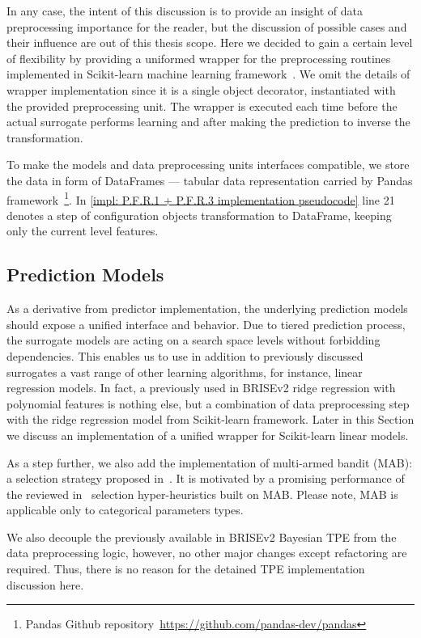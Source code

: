 In any case, the intent of this discussion is to provide an insight of data preprocessing importance for the reader, but the discussion of possible cases and their influence are out of this thesis scope. Here we decided to gain a certain level of flexibility by providing a uniformed wrapper for the preprocessing routines implemented in Scikit-learn machine learning framework~\cite{scikit-learn}. We omit the details of wrapper implementation since it is a single object decorator, instantiated with the provided preprocessing unit. The wrapper is executed each time before the actual surrogate performs learning and after making the prediction to inverse the transformation.

To make the models and data preprocessing units interfaces compatible, we store the data in form of DataFrames --- tabular data representation carried by Pandas framework~\footnote{Pandas Github repository~\url{https://github.com/pandas-dev/pandas}}. In \cref{impl: P.F.R.1 + P.F.R.3 implementation pseudocode} line 21 denotes a step of configuration objects transformation to DataFrame, keeping only the current level features.


\subsection{Prediction Models}\label{impl: prediction models}
As a derivative from predictor implementation, the underlying prediction models should expose a unified interface and behavior. Due to tiered prediction process, the surrogate models are acting on a search space levels without forbidding dependencies. This enables us to use in addition to previously discussed surrogates a vast range of other learning algorithms, for instance, linear regression models. In fact, a previously used in BRISEv2 ridge regression with polynomial features is nothing else, but a combination of data preprocessing step with the ridge regression model from Scikit-learn framework. Later in this Section we discuss an implementation of a unified wrapper for Scikit-learn linear models.

As a step further, we also add the implementation of multi-armed bandit (MAB): a selection strategy proposed in~\cite{auer2002finite}. It is motivated by a promising performance of the reviewed in~\cite{auer2002finite} selection hyper-heuristics built on MAB. Please note, MAB is applicable only to categorical parameters types.

We also decouple the previously available in BRISEv2 Bayesian TPE from the data preprocessing logic, however, no other major changes except refactoring are required. Thus, there is no reason for the detained TPE implementation discussion here.

